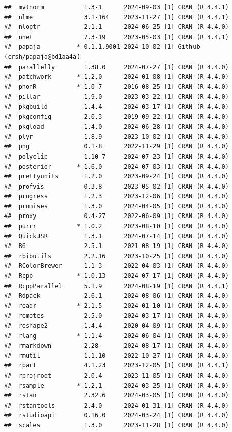 \documentclass[
  11pt,
  man,mask,floatsintext]{apa6}
\begin{document}
\begin{verbatim}
##  mvtnorm           1.3-1      2024-09-03 [1] CRAN (R 4.4.1)
##  nlme              3.1-164    2023-11-27 [1] CRAN (R 4.4.1)
##  nloptr            2.1.1      2024-06-25 [1] CRAN (R 4.4.0)
##  nnet              7.3-19     2023-05-03 [1] CRAN (R 4.4.1)
##  papaja          * 0.1.1.9001 2024-10-02 [1] Github (crsh/papaja@bd1aa4a)
##  parallelly        1.38.0     2024-07-27 [1] CRAN (R 4.4.0)
##  patchwork       * 1.2.0      2024-01-08 [1] CRAN (R 4.4.0)
##  phonR           * 1.0-7      2016-08-25 [1] CRAN (R 4.4.0)
##  pillar            1.9.0      2023-03-22 [1] CRAN (R 4.4.0)
##  pkgbuild          1.4.4      2024-03-17 [1] CRAN (R 4.4.0)
##  pkgconfig         2.0.3      2019-09-22 [1] CRAN (R 4.4.0)
##  pkgload           1.4.0      2024-06-28 [1] CRAN (R 4.4.0)
##  plyr              1.8.9      2023-10-02 [1] CRAN (R 4.4.0)
##  png               0.1-8      2022-11-29 [1] CRAN (R 4.4.0)
##  polyclip          1.10-7     2024-07-23 [1] CRAN (R 4.4.0)
##  posterior       * 1.6.0      2024-07-03 [1] CRAN (R 4.4.0)
##  prettyunits       1.2.0      2023-09-24 [1] CRAN (R 4.4.0)
##  profvis           0.3.8      2023-05-02 [1] CRAN (R 4.4.0)
##  progress          1.2.3      2023-12-06 [1] CRAN (R 4.4.0)
##  promises          1.3.0      2024-04-05 [1] CRAN (R 4.4.0)
##  proxy             0.4-27     2022-06-09 [1] CRAN (R 4.4.0)
##  purrr           * 1.0.2      2023-08-10 [1] CRAN (R 4.4.0)
##  QuickJSR          1.3.1      2024-07-14 [1] CRAN (R 4.4.0)
##  R6                2.5.1      2021-08-19 [1] CRAN (R 4.4.0)
##  rbibutils         2.2.16     2023-10-25 [1] CRAN (R 4.4.0)
##  RColorBrewer      1.1-3      2022-04-03 [1] CRAN (R 4.4.0)
##  Rcpp            * 1.0.13     2024-07-17 [1] CRAN (R 4.4.0)
##  RcppParallel      5.1.9      2024-08-19 [1] CRAN (R 4.4.1)
##  Rdpack            2.6.1      2024-08-06 [1] CRAN (R 4.4.0)
##  readr           * 2.1.5      2024-01-10 [1] CRAN (R 4.4.0)
##  remotes           2.5.0      2024-03-17 [1] CRAN (R 4.4.0)
##  reshape2          1.4.4      2020-04-09 [1] CRAN (R 4.4.0)
##  rlang           * 1.1.4      2024-06-04 [1] CRAN (R 4.4.0)
##  rmarkdown         2.28       2024-08-17 [1] CRAN (R 4.4.0)
##  rmutil            1.1.10     2022-10-27 [1] CRAN (R 4.4.0)
##  rpart             4.1.23     2023-12-05 [1] CRAN (R 4.4.1)
##  rprojroot         2.0.4      2023-11-05 [1] CRAN (R 4.4.0)
##  rsample         * 1.2.1      2024-03-25 [1] CRAN (R 4.4.0)
##  rstan             2.32.6     2024-03-05 [1] CRAN (R 4.4.0)
##  rstantools        2.4.0      2024-01-31 [1] CRAN (R 4.4.0)
##  rstudioapi        0.16.0     2024-03-24 [1] CRAN (R 4.4.0)
##  scales            1.3.0      2023-11-28 [1] CRAN (R 4.4.0)

\end{verbatim}
\end{document}
